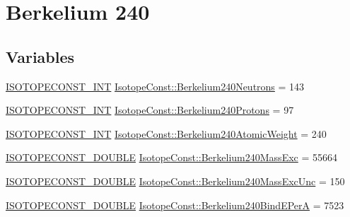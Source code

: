 \hypertarget{group___isotope_const-_berkelium-_bk240}{}\section{Berkelium 240}
\label{group___isotope_const-_berkelium-_bk240}
\subsection*{Variables}
\begin{DoxyCompactItemize}
\item 
\mbox{\hyperlink{group___isotope_const-_macros_ga5f18360b3e99483a35c32d789e62621c}{I\+S\+O\+T\+O\+P\+E\+C\+O\+N\+S\+T\+\_\+\+I\+NT}} \mbox{\hyperlink{group___isotope_const-_berkelium-_bk240_ga5291bff9553352a71296cd193cefe85d}{Isotope\+Const\+::\+Berkelium240\+Neutrons}} = 143
\item 
\mbox{\hyperlink{group___isotope_const-_macros_ga5f18360b3e99483a35c32d789e62621c}{I\+S\+O\+T\+O\+P\+E\+C\+O\+N\+S\+T\+\_\+\+I\+NT}} \mbox{\hyperlink{group___isotope_const-_berkelium-_bk240_gaa2ab5c2afed7594ad487524f3aed7b6f}{Isotope\+Const\+::\+Berkelium240\+Protons}} = 97
\item 
\mbox{\hyperlink{group___isotope_const-_macros_ga5f18360b3e99483a35c32d789e62621c}{I\+S\+O\+T\+O\+P\+E\+C\+O\+N\+S\+T\+\_\+\+I\+NT}} \mbox{\hyperlink{group___isotope_const-_berkelium-_bk240_ga5e41945eed276f3f81c7129ed103fbcd}{Isotope\+Const\+::\+Berkelium240\+Atomic\+Weight}} = 240
\item 
\mbox{\hyperlink{group___isotope_const-_macros_ga8f45a7272ce02c0b4c65c44636ed719a}{I\+S\+O\+T\+O\+P\+E\+C\+O\+N\+S\+T\+\_\+\+D\+O\+U\+B\+LE}} \mbox{\hyperlink{group___isotope_const-_berkelium-_bk240_ga10f959f049ac39a26137a968509c95cf}{Isotope\+Const\+::\+Berkelium240\+Mass\+Exc}} = 55664
\item 
\mbox{\hyperlink{group___isotope_const-_macros_ga8f45a7272ce02c0b4c65c44636ed719a}{I\+S\+O\+T\+O\+P\+E\+C\+O\+N\+S\+T\+\_\+\+D\+O\+U\+B\+LE}} \mbox{\hyperlink{group___isotope_const-_berkelium-_bk240_ga25a38aeab47b07397bb0d9e61b7f96bf}{Isotope\+Const\+::\+Berkelium240\+Mass\+Exc\+Unc}} = 150
\item 
\mbox{\hyperlink{group___isotope_const-_macros_ga8f45a7272ce02c0b4c65c44636ed719a}{I\+S\+O\+T\+O\+P\+E\+C\+O\+N\+S\+T\+\_\+\+D\+O\+U\+B\+LE}} \mbox{\hyperlink{group___isotope_const-_berkelium-_bk240_ga49f006875794ed54300c04fc99c09d49}{Isotope\+Const\+::\+Berkelium240\+Bind\+E\+PerA}} = 7523
\item 

\end{DoxyCompactItemize}
